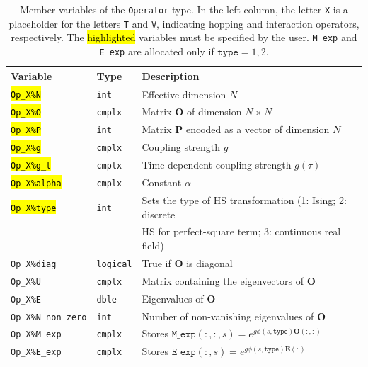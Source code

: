 \begin{table}[h!]
	\begin{center}
    \begin{tabular}{@{} l l l @{}}\toprule
    Variable & Type & Description \\\midrule
    \hl{\texttt{Op\_X\%N}}       & \texttt{int}     &  Effective dimension $N$ \\
    \hl{\texttt{Op\_X\%O}}       & \texttt{cmplx}   &  Matrix  $\bm{O}$  of dimension $N \times N$\\
    \hl{\texttt{Op\_X\%P}}       & \texttt{int}     &  Matrix $\bm{P}$  encoded as a vector of dimension $N$\\
    \hl{\texttt{Op\_X\%g}}       & \texttt{cmplx}   &  Coupling strength $g$ \\  
     \hl{\texttt{Op\_X\%g\_t}}       & \texttt{cmplx}   &  Time dependent coupling strength $g(\tau)$ \\  
    \hl{\texttt{Op\_X\%alpha}}   & \texttt{cmplx}   &  Constant $\alpha$ \\
    \hl{\texttt{Op\_X\%type}}    & \texttt{int}     &  Sets the type of HS transformation (1: Ising; 2: discrete\\
             &   &    HS for perfect-square term; 3: continuous real field)  \\ 
    \texttt{Op\_X\%diag}         & \texttt{logical} &  True if   $\bm{O}$  is  diagonal  \\
    \texttt{Op\_X\%U}            & \texttt{cmplx}   &  Matrix containing the eigenvectors of $\bm{O}$  \\
    \texttt{Op\_X\%E}            & \texttt{dble}    &  Eigenvalues of $\bm{O}$ \\
    \texttt{Op\_X\%N\_non\_zero} & \texttt{int}     &  Number of non-vanishing eigenvalues of $\bm{O}$  \\
    \texttt{Op\_X\%M\_exp}       & \texttt{cmplx}   &  Stores $ \texttt{M\_exp}(:,:,s) = e^{g  \phi(s,\texttt{type}) \bm{O}(:,:)} $  \\
    \texttt{Op\_X\%E\_exp}       & \texttt{cmplx}   &  Stores $ \texttt{E\_exp}(:,s) = e^{g  \phi(s,\texttt{type}) \bm{E}(:)} $ 
     \\\bottomrule
   \end{tabular}
   \caption{Member variables of the \texttt{Operator}  type. 
   In the left column, the letter \texttt{X} is a placeholder for the letters \texttt{T} and \texttt{V}, 
   indicating hopping and interaction operators, respectively.
   The \hl{highlighted} variables must be specified by the user. \texttt{M\_exp} and \texttt{E\_exp}  are allocated only if  $\texttt{type}=1,2$. 
    \label{table:operator}}
\end{center}
\end{table}
%



